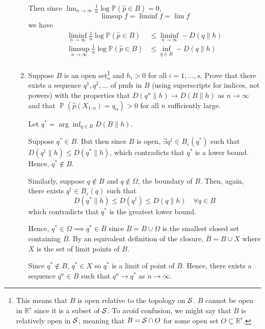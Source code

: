 \documentclass[12pt]{article}
\renewcommand{\hat}[1]{\widehat{#1}}
\renewcommand{\P}{\mathbb{P}}
\newcommand{\ep}{\varepsilon}
\renewcommand{\bar}[1]{\overline{#1}}
\DeclareMathOperator{\Prob}{\mathbb{P}}
\begin{document}
\begin{enumerate}[1.]
\begin{enumerate}
		            Then since $\lim_{n \to \infty} \frac{1}{n} \log \P(\hat p \in B) = 0$,
		            \[\limsup f = \liminf f = \lim f\]
		            we have
		            \begin{align*}
			            \liminf_{n\to\infty} \frac{1}{n} \log \P(\hat p \in B) & \leq\liminf_{n\to \infty} -D(q\|h) \\
			            \limsup_{n\to\infty} \frac{1}{n} \log \P(\hat p \in B) & \leq \inf_{q \in B} -D(q\|h)       \\
		            \end{align*}
		            \color{black}


		      \item Suppose $B$ is an open set\footnote{This means that $B$ is open relative to the topology on ${\cal S}$. $B$ cannot be open in $\mathbb{R}^s$ since it is a subset of ${\cal S}$. To avoid confusion, we might say that $B$ is relatively open in ${\cal S}$, meaning that $B={\cal S}\cap O$ for some open set $O\subseteq\mathbb{R}^s$.} and $h_i > 0$ for all $i=1,\dotsc,s$. Prove that there exists a sequence $q^1,q^2,\dotsc$ of pmfs in $B$ (using superscripts for indices, not powers) with the properties that $D(q^n\|h)\to D(B\|h)$ as $n\to\infty$ and that $\Prob(\widehat p(X_{1:n})=q_n) > 0$ for all $n$ sufficiently large.

		            \color{red}
		            Let $q^* = \arg\inf_{q \in B} D(B \| h)$.

		            Suppose $q^* \in B$. But then since $B$ is open, $\exists q^{\dagger} \in B_{\ep}(q^*)$ such that $D(q^{\dagger} \| h) \leq D(q^* \| h)$, which contradicts that $q^*$ is a lower bound. Hence, $q^* \notin B$.

		            Similarly, suppose $q \notin B$ and $q \notin \Omega$, the boundary of $B$. Then, again, there exists $q^{\dagger} \in B_{\ep}(q)$ such that
		            \[D(q^* \| h) \leq D(q^{\dagger}) \leq D(q \| h) \quad \forall q\in B\]
		            which contradicts that $q^*$ is the greatest lower bound.

		            Hence, $q^* \in \Omega \implies q^* \in \bar B$ since $\bar B = B \cup \Omega$ is the smallest closed set containing $B$. By an equivalent definition of the closure, $\bar B = B \cup X$ where $X$ is the set of limit points of $B$.

		            Since $q^* \notin B$, $q^* \in X$ so $q^*$ is a limit of point of $B$. Hence, there exists a sequence $q^n \in B$ such that $q^n \to q^*$ as $n \to \infty$.


\end{enumerate}
\end{enumerate}
\end{document}
